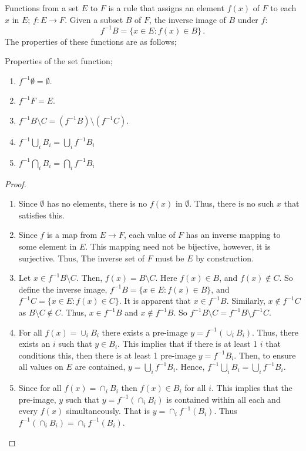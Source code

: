 Functions from a set $E$ to $F$ is a rule that assigns an element $f(x)$ of $F$ to each $x$ in $E$; $f:E\rightarrow F$. Given a subset $B$ of $F$, the inverse image of $B$ under $f$:
\begin{equation}
	f^{-1}B = \{x\in E: f(x) \in B\}\,.
\end{equation}
The properties of these functions are as follows;
\begin{definition}
	Properties of the set function;
	\begin{enumerate}
		\item $f^{-1}\emptyset = \emptyset$.
		\item $f^{-1}F = E$.
		\item $f^{-1}B\setminus C = (f^{-1}B)\setminus (f^{-1}C)$.
		\item $f^{-1}\bigcup_i B_i = \bigcup_i f^{-1} B_i$
		\item $f^{-1}\bigcap_i B_i = \bigcap_i f^{-1} B_i$
	\end{enumerate}
	\begin{proof}
		\begin{enumerate}
			\item Since $\emptyset$ has no elements, there is no $f(x)$ in $\emptyset$. Thus, there is no such $x$ that satisfies this.
			\item Since $f$ is a map from $E \rightarrow F$, each value of $F$ has an inverse mapping to some element in $E$. This mapping need not be bijective, however, it is surjective. Thus, The inverse set of $F$ must be $E$ by construction.
			\item Let $x \in f^{-1}B\setminus C$. Then, $f(x) = B\setminus C$. Here $f(x) \in B$, and $f(x) \notin C$. So define the inverse image, $f^{-1}B = \{x\in E:f(x) \in B\}$, and $f^{-1}C = \{x\in E:f(x) \in C\}$. It is apparent that $x \in f^{-1}B$. Similarly, $x\notin f^{-1}C$ as $B\setminus C \notin C$. Thus, $x\in f^{-1}B$ and $x\notin f^{-1}B$. So $f^{-1}B\setminus C = f^{-1}B\setminus f^{-1}C$.
			\item For all $f(x) = \cup_i B_i$ there exists a pre-image $y = f^{-1}(\cup_i B_i)$. Thus, there exists an $i$ such that $y \in B_i$. This implies that if there is at least 1 $i$ that conditions this, then there is at least 1 pre-image $y = f^{-1}B_i$. Then, to ensure all values on $E$ are contained, $y = \bigcup_i f^{-1}B_i$. Hence, $f^{-1}\bigcup_iB_i=\bigcup_i f^{-1}B_i$.
			\item Since for all $f(x) = \cap_i B_i$ then $f(x) \in B_i$ for all $i$. This implies that the pre-image, $y$ such that $y = f^{-1}(\cap_i B_i)$ is contained within all each and every $f(x)$ simultaneously. That is $y = \cap_i f^{-1}(B_i)$. Thus  $f^{-1}(\cap_i B_i)= \cap_i f^{-1}(B_i)$.
		\end{enumerate}
	\end{proof}
\end{definition}

